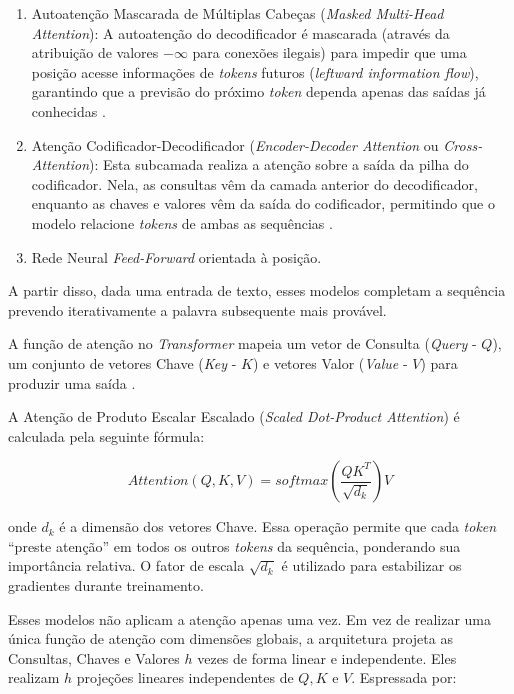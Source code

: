 \documentclass[
    12pt,                %
    openright,           %
    oneside,             %
    a4paper,             %
    english,             %
    brazil               %
]{abntex2}
\begin{document}
\begin{itemize}
\begin{itemize}
\begin{enumerate}
  \item Autoatenção Mascarada de Múltiplas Cabeças (\textit{Masked Multi-Head Attention}):
A autoatenção do decodificador é mascarada (através da atribuição de valores $-\infty$ para conexões ilegais) para impedir que uma posição acesse informações de \textit{tokens} futuros (\textit{leftward information flow}), garantindo que a previsão do próximo \textit{token} dependa apenas das saídas já conhecidas \cite{vaswani2017attention, tunstall2022natural}.
  \item Atenção Codificador-Decodificador (\textit{Encoder-Decoder Attention} ou \textit{Cross-Attention}):
Esta subcamada realiza a atenção sobre a saída da pilha do codificador.
Nela, as consultas vêm da camada anterior do decodificador, enquanto as chaves e valores vêm da saída do codificador, permitindo que o modelo relacione \textit{tokens} de ambas as sequências \cite{vaswani2017attention, tunstall2022natural, jurafsky2026speech}.
  \item Rede Neural \textit{Feed-Forward} orientada à posição.
\end{enumerate}

\par
A partir disso, dada uma entrada de texto, esses modelos completam a sequência prevendo iterativamente a palavra subsequente mais provável.
\end{itemize}

\par
A função de atenção no \textit{Transformer} mapeia um vetor de Consulta (\textit{Query} - $Q$), um conjunto de vetores Chave (\textit{Key} - $K$) e vetores Valor (\textit{Value} - $V$) para produzir uma saída \cite{vaswani2017attention, tunstall2022natural}.
\par
A Atenção de Produto Escalar Escalado (\textit{Scaled Dot-Product Attention}) é calculada pela seguinte fórmula:

\begin{equation}
  Attention(Q, K, V) = softmax\left(\frac{QK^T}{\sqrt{d_k}}\right)V 
\end{equation}

\par
onde $d_{k}$ é a dimensão dos vetores Chave. Essa operação permite que cada \textit{token} ``preste atenção'' em todos os outros \textit{tokens} da sequência, ponderando sua importância relativa.
O fator de escala $\sqrt{d_k}$ é utilizado para estabilizar os gradientes durante treinamento.
\par
Esses modelos não aplicam a atenção apenas uma vez.
Em vez de realizar uma única função de atenção com dimensões globais, a arquitetura projeta as Consultas, Chaves e Valores $h$ vezes de forma linear e independente.
Eles realizam $h$ projeções lineares independentes de $Q, K$ e $V$.
Espressada por:


\end{itemize}
\end{document}
